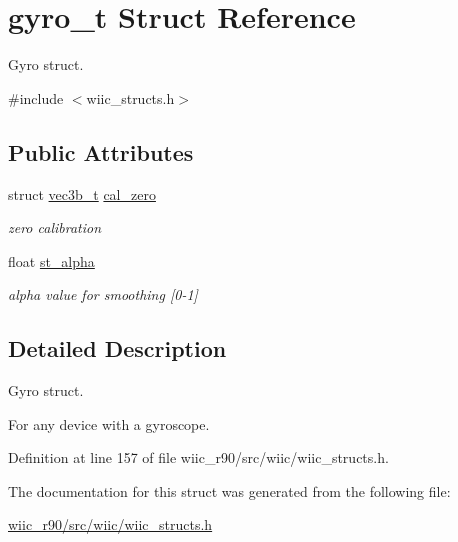 \hypertarget{structgyro__t}{\section{gyro\-\_\-t Struct Reference}
\label{structgyro__t}
}


Gyro struct.  




{\ttfamily \#include $<$wiic\-\_\-structs.\-h$>$}

\subsection*{Public Attributes}
\begin{DoxyCompactItemize}
\item 
\hypertarget{structgyro__t_a1a2b1fdd479dd7cbd2f70b2a2cd93e0b}{struct \hyperlink{structvec3b__t}{vec3b\-\_\-t} \hyperlink{structgyro__t_a1a2b1fdd479dd7cbd2f70b2a2cd93e0b}{cal\-\_\-zero}}\label{structgyro__t_a1a2b1fdd479dd7cbd2f70b2a2cd93e0b}

\begin{DoxyCompactList}\small\item\em zero calibration \end{DoxyCompactList}\item 
\hypertarget{structgyro__t_a05d652ae9beed165d906573c002c7560}{float \hyperlink{structgyro__t_a05d652ae9beed165d906573c002c7560}{st\-\_\-alpha}}\label{structgyro__t_a05d652ae9beed165d906573c002c7560}

\begin{DoxyCompactList}\small\item\em alpha value for smoothing \mbox{[}0-\/1\mbox{]} \end{DoxyCompactList}\end{DoxyCompactItemize}


\subsection{Detailed Description}
Gyro struct. 

For any device with a gyroscope. 

Definition at line 157 of file wiic\-\_\-r90/src/wiic/wiic\-\_\-structs.\-h.



The documentation for this struct was generated from the following file\-:\begin{DoxyCompactItemize}
\item 
\hyperlink{wiic__r90_2src_2wiic_2wiic__structs_8h}{wiic\-\_\-r90/src/wiic/wiic\-\_\-structs.\-h}\end{DoxyCompactItemize}

